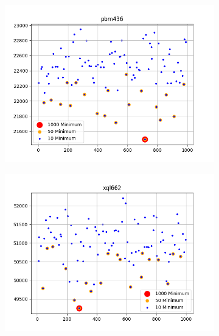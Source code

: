 \documentclass{article}
\def\v{0.4}
\begin{document}
\begin{figure}[h!]
\begin{subfigure}[b]{\v\linewidth}
		\includegraphics[width=\linewidth]{graphs/min_pbm436.png}
	\end{subfigure}
	\begin{subfigure}[b]{\v\linewidth}
		\includegraphics[width=\linewidth]{graphs/min_xql662.png}
	\end{subfigure}
\end{figure}
\end{document}
